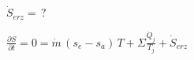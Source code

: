 \( \dot{S}_{erz} = \, ? \)  

\( \frac{\partial S}{\partial t} = 0 = \dot{m} \, (s_e - s_a) \, T + \Sigma \frac{\dot{Q}_j}{T_j} + \dot{S}_{erz} \)